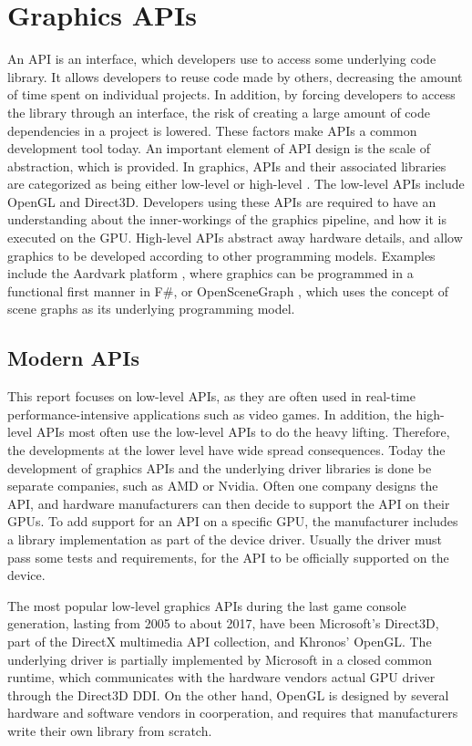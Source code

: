 \section{Graphics APIs}\label{sec:graphics_apis}
An \gls{API} is an interface, which developers use to access some underlying code library.
It allows developers to reuse code made by others, decreasing the amount of time spent on individual projects.
In addition, by forcing developers to access the library through an interface, the risk of creating a large amount of code dependencies in a project is lowered.
These factors make \glspl{API} a common development tool today.\cite{apiEvaluation}
An important element of \gls{API} design is the scale of abstraction, which is provided.
In graphics, \glspl{API} and their associated libraries are categorized as being either low-level or high-level \cite{wikiGraphicsLibs}.
The low-level \glspl{API} include OpenGL and Direct3D. Developers using these \glspl{API} are required to have an understanding about the inner-workings of the graphics pipeline, and how it is executed on the \gls{GPU}.
High-level \glspl{API} abstract away hardware details, and allow graphics to be developed according to other programming models.
Examples include the Aardvark platform \cite{aardvark}, where graphics can be programmed in a functional first manner in F\#, or OpenSceneGraph \cite{openSceneGraph}, which uses the concept of scene graphs as its underlying programming model. 

\subsection{Modern APIs}
This report focuses on low-level \glspl{API}, as they are often used in real-time performance-intensive applications such as video games.
In addition, the high-level \glspl{API} most often use the low-level \glspl{API} to do the heavy lifting.
Therefore, the developments at the lower level have wide spread consequences.
Today the development of graphics \glspl{API} and the underlying driver libraries is done be separate companies, such as AMD or Nvidia.
Often one company designs the \gls{API}, and hardware manufacturers can then decide to support the \gls{API} on their \glspl{GPU}.
To add support for an \gls{API} on a specific \gls{GPU}, the manufacturer includes a library implementation as part of the device driver.
Usually the driver must pass some tests and requirements, for the \gls{API} to be officially supported on the device.   

The most popular low-level graphics \glspl{API} during the last game console generation, lasting from 2005 to about 2017, have been Microsoft’s Direct3D, part of the DirectX multimedia API collection, and Khronos’ OpenGL. 
The underlying driver is partially implemented by Microsoft in a closed common runtime, which communicates with the hardware vendors actual \gls{GPU} driver through the Direct3D \gls{DDI}\cite{dxDDI}.
On the other hand, OpenGL is designed by several hardware and software vendors in coorperation, and requires that manufacturers write their own library from scratch. 

